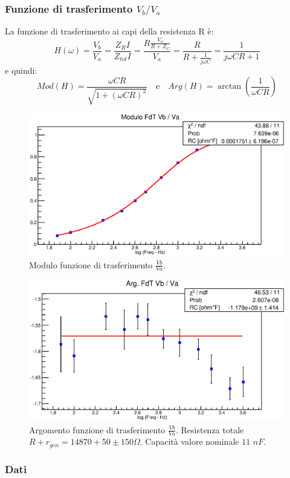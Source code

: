 \subsubsection{Funzione di trasferimento $V_b/V_a$}
La funzione di trasferimento ai capi della resistenza R è:
  $$ H(\omega) = \frac{V_b}{V_a} = \frac{Z_RI}{Z_{tot}I} =  \frac{R \frac{V_a}{R+Z_C}}{V_a} =
  \frac{R}{R + \frac{1}{j\omega C} } = \frac{1}{j\omega CR + 1} $$
e quindi:
  $$ Mod(H) = \frac{\omega C R}{\sqrt{1 + (\omega CR)^2}} \quad \mathrm{e} \quad Arg(H) = \arctan(\frac{1}{\omega CR})$$
%
\begin{figure}[H]
    \centering
    \includegraphics[scale=.6]{Grafici/C2_P2_ModFdt2_.eps}
    \caption
    {
        Modulo funzione di trasferimento $ \tfrac{Vb}{Va} $.
    }
    \label{fig:C2_P2_ModFdt2}
\end{figure}
%
\begin{figure}[H]
    \centering
    \includegraphics[scale=.6]{Grafici/C2_P2_ArgFdt2_.eps}
    \caption
    {
        Argomento funzione di trasferimento $ \tfrac{Vb}{Va} $.
        Resistenza totale $ R + r_{gen} = 14870 + 50 \pm 150 \Omega $.
        Capacità valore nominale $11$ $nF$.
    }
    \label{fig:C2_P2_ArgFdt2}
\end{figure}
\subsubsection{Dati}



